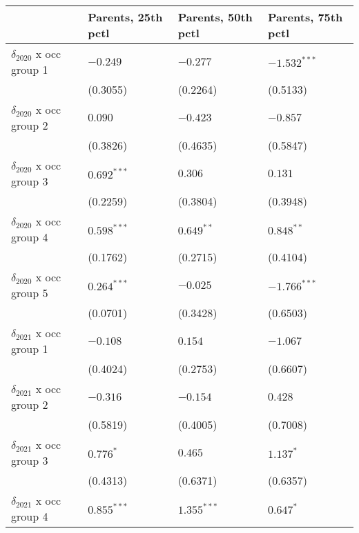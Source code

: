 \begin{tabular}{llll}
\toprule
{} & Parents, 25th pctl & Parents, 50th pctl & Parents, 75th pctl \\
\midrule
$\delta_{2020}$ x occ group 1          &           $-0.249$ &           $-0.277$ &     $-1.532^{***}$ \\
                                       &           (0.3055) &           (0.2264) &           (0.5133) \\
$\delta_{2020}$ x occ group 2          &            $0.090$ &           $-0.423$ &           $-0.857$ \\
                                       &           (0.3826) &           (0.4635) &           (0.5847) \\
$\delta_{2020}$ x occ group 3          &      $0.692^{***}$ &            $0.306$ &            $0.131$ \\
                                       &           (0.2259) &           (0.3804) &           (0.3948) \\
$\delta_{2020}$ x occ group 4          &      $0.598^{***}$ &       $0.649^{**}$ &       $0.848^{**}$ \\
                                       &           (0.1762) &           (0.2715) &           (0.4104) \\
$\delta_{2020}$ x occ group 5          &      $0.264^{***}$ &           $-0.025$ &     $-1.766^{***}$ \\
                                       &           (0.0701) &           (0.3428) &           (0.6503) \\
$\delta_{2021}$ x occ group 1          &           $-0.108$ &            $0.154$ &           $-1.067$ \\
                                       &           (0.4024) &           (0.2753) &           (0.6607) \\
$\delta_{2021}$ x occ group 2          &           $-0.316$ &           $-0.154$ &            $0.428$ \\
                                       &           (0.5819) &           (0.4005) &           (0.7008) \\
$\delta_{2021}$ x occ group 3          &          $0.776^*$ &            $0.465$ &          $1.137^*$ \\
                                       &           (0.4313) &           (0.6371) &           (0.6357) \\
$\delta_{2021}$ x occ group 4          &      $0.855^{***}$ &      $1.355^{***}$ &          $0.647^*$ \\

\end{tabular}
